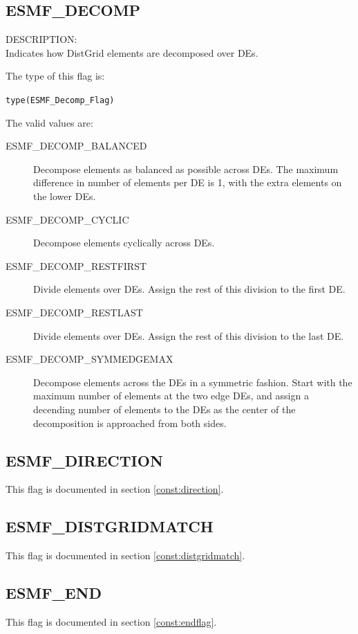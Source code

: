 \subsection{ESMF\_DECOMP}
\label{const:decompflag}
{\sf DESCRIPTION:\\}
Indicates how DistGrid elements are decomposed over DEs.

The type of this flag is:

{\tt type(ESMF\_Decomp\_Flag)}

The valid values are:
\begin{description}
\item [ESMF\_DECOMP\_BALANCED]
      Decompose elements as balanced as possible across DEs. The maximum 
      difference in number of elements per DE is 1, with the extra elements on
      the lower DEs.
\item [ESMF\_DECOMP\_CYCLIC]
      Decompose elements cyclically across DEs.
\item [ESMF\_DECOMP\_RESTFIRST]
      Divide elements over DEs. Assign the rest of this division to the first
      DE.
\item [ESMF\_DECOMP\_RESTLAST]
      Divide elements over DEs. Assign the rest of this division to the last DE.
\item [ESMF\_DECOMP\_SYMMEDGEMAX]
      Decompose elements across the DEs in a symmetric fashion. Start with the
      maximum number of elements at the two edge DEs, and assign a decending
      number of elements to the DEs as the center of the decomposition is 
      approached from both sides.
\end{description}

\subsection{ESMF\_DIRECTION}
This flag is documented in section \ref{const:direction}.

\subsection{ESMF\_DISTGRIDMATCH}
This flag is documented in section \ref{const:distgridmatch}.

\subsection{ESMF\_END}

This flag is documented in section \ref{const:endflag}.

